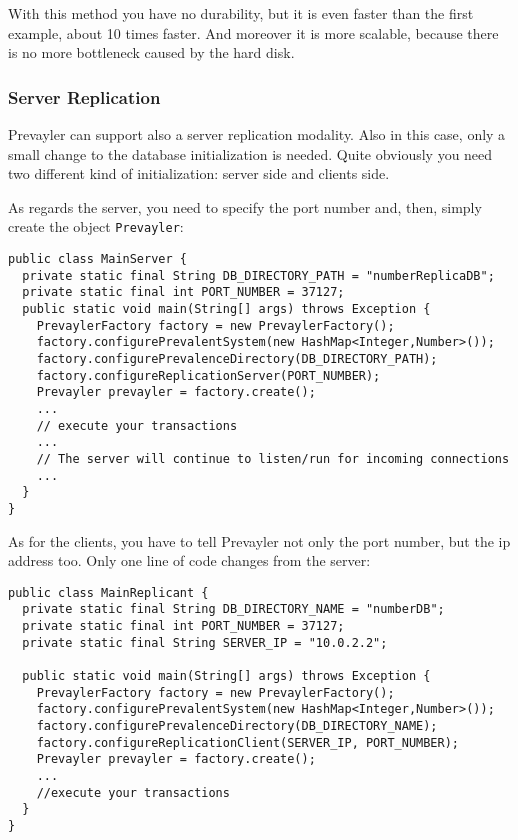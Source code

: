 			With this method you have no durability, but it is even faster than the first example, 
			about 10 times faster. And moreover it is more scalable, 
			because there is no more bottleneck caused by the hard disk. 			
	 		
	 		\subsubsection{Server Replication} \label{server-replication}
	 		Prevayler can support also a server replication modality. Also in this case, only a small 
	 		change to the database initialization is needed. Quite obviously you need two different kind of 
	 		initialization: server side and clients side.
	 		
	 		As regards the server, you need to specify the port number and, then, simply create the object 
	 		\lstinline!Prevayler!:
	 		\begin{lstlisting} 
public class MainServer {	
  private static final String DB_DIRECTORY_PATH = "numberReplicaDB";
  private static final int PORT_NUMBER = 37127;	
  public static void main(String[] args) throws Exception {
    PrevaylerFactory factory = new PrevaylerFactory();
    factory.configurePrevalentSystem(new HashMap<Integer,Number>());
    factory.configurePrevalenceDirectory(DB_DIRECTORY_PATH);
    factory.configureReplicationServer(PORT_NUMBER);
    Prevayler prevayler = factory.create();
    ...
    // execute your transactions
    ...
    // The server will continue to listen/run for incoming connections
    ...
  }
}
			\end{lstlisting}
			
			As for the clients, you have to tell Prevayler not only the port number, 
			but the ip address too. Only one line of code changes from the server:
			\begin{lstlisting} 
public class MainReplicant {	
  private static final String DB_DIRECTORY_NAME = "numberDB";
  private static final int PORT_NUMBER = 37127;
  private static final String SERVER_IP = "10.0.2.2";
	
  public static void main(String[] args) throws Exception {
    PrevaylerFactory factory = new PrevaylerFactory();
    factory.configurePrevalentSystem(new HashMap<Integer,Number>());
    factory.configurePrevalenceDirectory(DB_DIRECTORY_NAME);
    factory.configureReplicationClient(SERVER_IP, PORT_NUMBER);
    Prevayler prevayler = factory.create();
    ...
    //execute your transactions
  }
}
			\end{lstlisting}
			
